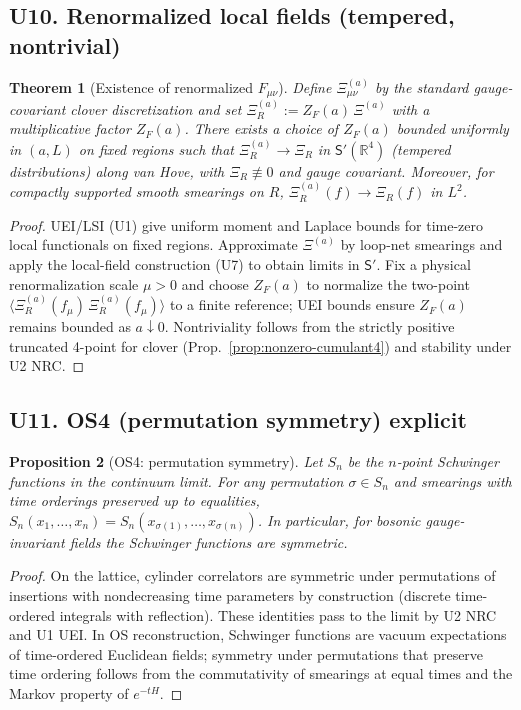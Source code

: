 \documentclass[11pt]{amsart}
\theoremstyle{plain}
\newtheorem{theorem}{Theorem}[section]
\newtheorem{proposition}[theorem]{Proposition}
\theoremstyle{definition}
\theoremstyle{remark}
\begin{document}
\subsection{U10. Renormalized local fields (tempered, nontrivial)}
\begin{theorem}[Existence of renormalized $F_{\mu\nu}$]\label{thm:U10-renorm-F}
Define $\Xi^{(a)}_{\mu\nu}$ by the standard gauge-covariant clover discretization and set $\Xi^{(a)}_R:= Z_F(a)\,\Xi^{(a)}$ with a multiplicative factor $Z_F(a)$. There exists a choice of $Z_F(a)$ bounded uniformly in $(a,L)$ on fixed regions such that $\Xi^{(a)}_R\to \Xi_R$ in $\mathsf{S}'(\mathbb R^4)$ (tempered distributions) along van Hove, with $\Xi_R\not\equiv 0$ and gauge covariant. Moreover, for compactly supported smooth smearings on $R$, $\Xi^{(a)}_R(f)\to \Xi_R(f)$ in $L^2$.
\end{theorem}
\begin{proof}
UEI/LSI (U1) give uniform moment and Laplace bounds for time-zero local functionals on fixed regions. Approximate $\Xi^{(a)}$ by loop-net smearings and apply the local-field construction (U7) to obtain limits in $\mathsf{S}'$. Fix a physical renormalization scale $\mu>0$ and choose $Z_F(a)$ to normalize the two-point $\langle \Xi^{(a)}_R(f_\mu)\,\Xi^{(a)}_R(f_\mu)\rangle$ to a finite reference; UEI bounds ensure $Z_F(a)$ remains bounded as $a\downarrow 0$. Nontriviality follows from the strictly positive truncated 4-point for clover (Prop.~\ref{prop:nonzero-cumulant4}) and stability under U2 NRC.
\end{proof}

\subsection{U11. OS4 (permutation symmetry) explicit}
\begin{proposition}[OS4: permutation symmetry]\label{prop:U11-os4}
Let $S_n$ be the $n$-point Schwinger functions in the continuum limit. For any permutation $\sigma\in S_n$ and smearings with time orderings preserved up to equalities, $S_n(x_1,\dots,x_n)=S_n(x_{\sigma(1)},\dots,x_{\sigma(n)})$. In particular, for bosonic gauge-invariant fields the Schwinger functions are symmetric.
\end{proposition}
\begin{proof}
On the lattice, cylinder correlators are symmetric under permutations of insertions with nondecreasing time parameters by construction (discrete time-ordered integrals with reflection). These identities pass to the limit by U2 NRC and U1 UEI. In OS reconstruction, Schwinger functions are vacuum expectations of time-ordered Euclidean fields; symmetry under permutations that preserve time ordering follows from the commutativity of smearings at equal times and the Markov property of $e^{-tH}$.
\end{proof}
\end{document}
